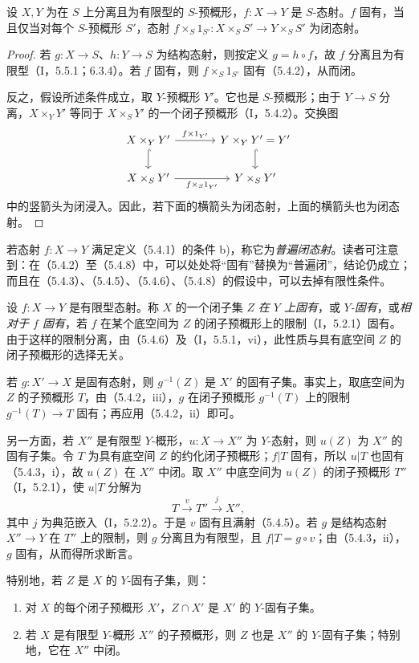 设 $X,Y$ 为在 $S$ 上分离且为有限型的 $S$-预概形，$f:X\to Y$ 是 $S$-态射。$f$ 固有，当且仅当对每个 $S$-预概形 $S'$，态射
$f\times_S1_{S'}:X\times_S S'\to Y\times_S S'$ 为闭态射。
\begin{proof}
若 $g:X\to S$、$h:Y\to S$ 为结构态射，则按定义 $g=h\circ f$，故 $f$ 分离且为有限型（I，5.5.1；6.3.4）。若 $f$ 固有，则 $f\times_S1_{S'}$ 固有（5.4.2），从而闭。

反之，假设所述条件成立，取 $Y$-预概形 $Y'$。它也是 $S$-预概形；由于 $Y\to S$ 分离，$X\times_Y Y'$ 等同于 $X\times_S Y'$ 的一个闭子预概形（I，5.4.2）。交换图
\[
\begin{tikzcd}[column sep=large]
X\times_Y Y'\arrow[r,"f\times1_{Y'}"]\arrow[d,hook]&Y\times_Y Y'=Y'\arrow[d,hook]\\
X\times_S Y'\arrow[r,"f\times_S1_{Y'}"']&Y\times_S Y'
\end{tikzcd}
\]
中的竖箭头为闭浸入。因此，若下面的横箭头为闭态射，上面的横箭头也为闭态射。
\end{proof}

若态射 $f:X\to Y$ 满足定义（5.4.1）的条件 b)，称它为\emph{普遍闭态射}。读者可注意到：在（5.4.2）至（5.4.8）中，可以处处将“固有”替换为“普遍闭”，结论仍成立；而且在（5.4.3）、（5.4.5）、（5.4.6）、（5.4.8）的假设中，可以去掉有限性条件。

设 $f:X\to Y$ 是有限型态射。称 $X$ 的一个闭子集 $Z$ \emph{在 $Y$ 上固有}，或 \emph{$Y$-固有}，或\emph{相对于 $f$ 固有}，若 $f$ 在某个底空间为 $Z$ 的闭子预概形上的限制（I，5.2.1）固有。由于这样的限制分离，由（5.4.6）及（I，5.5.1，vi），此性质与具有底空间 $Z$ 的闭子预概形的选择无关。

若 $g:X'\to X$ 是固有态射，则 $g^{-1}(Z)$ 是 $X'$ 的固有子集。事实上，取底空间为 $Z$ 的子预概形 $T$，由（5.4.2，iii），$g$ 在闭子预概形 $g^{-1}(T)$ 上的限制 $g^{-1}(T)\to T$ 固有；再应用（5.4.2，ii）即可。

另一方面，若 $X''$ 是有限型 $Y$-概形，$u:X\to X''$ 为 $Y$-态射，则 $u(Z)$ 为 $X''$ 的固有子集。令 $T$ 为具有底空间 $Z$ 的约化闭子预概形；$f|T$ 固有，所以 $u|T$ 也固有（5.4.3，i），故 $u(Z)$ 在 $X''$ 中闭。取 $X''$ 中底空间为 $u(Z)$ 的闭子预概形 $T''$（I，5.2.1），使 $u|T$ 分解为
\[
T\xrightarrow{v}T''\xrightarrow{j}X'',
\]
其中 $j$ 为典范嵌入（I，5.2.2）。于是 $v$ 固有且满射（5.4.5）。若 $g$ 是结构态射 $X''\to Y$ 在 $T''$ 上的限制，则 $g$ 分离且为有限型，且 $f|T=g\circ v$；由（5.4.3，ii），$g$ 固有，从而得所求断言。

特别地，若 $Z$ 是 $X$ 的 $Y$-固有子集，则：
\begin{enumerate}[label=\arabic*°]
\item 对 $X$ 的每个闭子预概形 $X'$，$Z\cap X'$ 是 $X'$ 的 $Y$-固有子集。
\item 若 $X$ 是有限型 $Y$-概形 $X''$ 的子预概形，则 $Z$ 也是 $X''$ 的 $Y$-固有子集；特别地，它在 $X''$ 中闭。
\end{enumerate}


